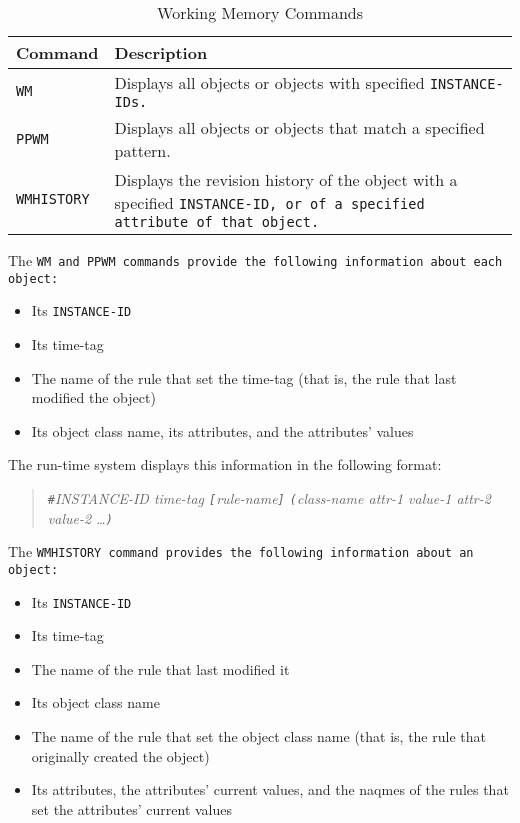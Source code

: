 \begin{table}[h]
  \begin{tabularx}{\columnwidth}{lX}
    \toprule
    Command & Description \\
    \midrule
    \tt{WM} &  Displays all objects or objects with specified 
              \tt{INSTANCE-ID}s. \\
    \tt{PPWM} & Displays all objects or objects that match a 
                specified pattern. \\
    \tt{WMHISTORY} & Displays the revision history of the object with
                     a specified \tt{INSTANCE-ID}, or of a specified  
                     attribute of that object. \\
    \bottomrule
  \end{tabularx}
  \caption{Working Memory Commands}
  \label{t:9-2}
\end{table}

The \tt{WM} and \tt{PPWM} commands provide the following information
about each object:

\begin{itemize}
\item Its \tt{INSTANCE-ID}
\item Its time-tag
\item The name of the rule that set the time-tag (that is, the rule
  that last modified the object)
\item Its object class name, its attributes, and the attributes'
  values
\end{itemize}
  
The run-time system displays this information in the following
format:

\begin{quote}
  \verb|#|\it{INSTANCE-ID} \it{time-tag} \verb|[|\it{rule-name}\verb|]|
  \verb|(|\it{class-name} \ct\it{attr-1} \it{value-1}
  \ct\it{attr-2} \it{value-2} \ldots\verb|)|
\end{quote}

The \tt{WMHISTORY} command provides the following information about an
object:

\begin{itemize}
\item Its \tt{INSTANCE-ID}
\item Its time-tag
\item The name of the rule that last modified it
\item Its object class name
\item The name of the rule that set the object class name (that is,
  the rule that originally created the object)
\item Its attributes, the attributes' current values, and the naqmes
  of the rules that set the attributes' current values
\end{itemize}

